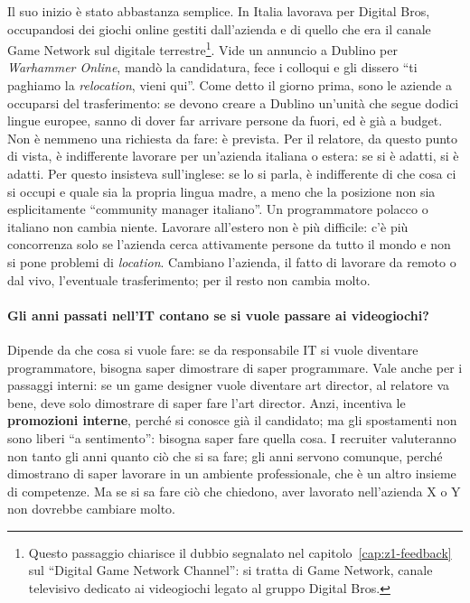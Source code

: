 Il suo inizio è stato abbastanza semplice. In Italia lavorava per Digital Bros, occupandosi dei giochi online gestiti
dall'azienda e di quello che era il canale Game Network sul digitale terrestre\footnote{Questo passaggio chiarisce il
dubbio segnalato nel capitolo~\ref{cap:z1-feedback} sul ``Digital Game Network Channel'': si tratta di Game Network,
canale televisivo dedicato ai videogiochi legato al gruppo Digital Bros.}. Vide un annuncio a Dublino per
\emph{Warhammer Online}, mandò la candidatura, fece i colloqui e gli dissero ``ti paghiamo la \emph{relocation}, vieni
qui''. Come detto il giorno prima, sono le aziende a occuparsi del trasferimento: se devono creare a Dublino un'unità
che segue dodici lingue europee, sanno di dover far arrivare persone da fuori, ed è già a budget. Non è nemmeno una
richiesta da fare: è prevista. Per il relatore, da questo punto di vista, è indifferente lavorare per un'azienda
italiana o estera: se si è adatti, si è adatti. Per questo insisteva sull'inglese: se lo si parla, è indifferente di
che cosa ci si occupi e quale sia la propria lingua madre, a meno che la posizione non sia esplicitamente ``community
manager italiano''. Un programmatore polacco o italiano non cambia niente. Lavorare all'estero non è più difficile: c'è
più concorrenza solo se l'azienda cerca attivamente persone da tutto il mondo e non si pone problemi di \emph{location}.
Cambiano l'azienda, il fatto di lavorare da remoto o dal vivo, l'eventuale trasferimento; per il resto non cambia
molto.

\paragraph{Gli anni passati nell'IT contano se si vuole passare ai videogiochi?} Dipende da che cosa si vuole fare: se
da responsabile IT si vuole diventare programmatore, bisogna saper dimostrare di saper programmare. Vale anche per i
passaggi interni: se un game designer vuole diventare art director, al relatore va bene, deve solo dimostrare di saper
fare l'art director. Anzi, incentiva le \textbf{promozioni interne}, perché si conosce già il candidato; ma gli
spostamenti non sono liberi ``a sentimento'': bisogna saper fare quella cosa. I recruiter valuteranno non tanto gli anni
quanto ciò che si sa fare; gli anni servono comunque, perché dimostrano di saper lavorare in un ambiente professionale,
che è un altro insieme di competenze. Ma se si sa fare ciò che chiedono, aver lavorato nell'azienda X o Y non dovrebbe
cambiare molto.

